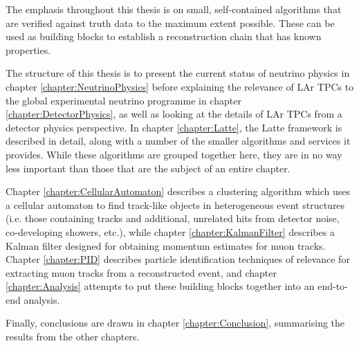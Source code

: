 The emphasis throughout this thesis is on small, self-contained algorithms that are verified against truth data to the maximum extent possible. These can be used as building blocks to establish a reconstruction chain that has known properties.

The structure of this thesis is to present the current status of neutrino physics in chapter \ref{chapter:NeutrinoPhysics} before explaining the relevance of \ac{LAr TPC}s to the global experimental neutrino programme in chapter \ref{chapter:DetectorPhysics}, as well as looking at the details of \ac{LAr TPC}s from a detector physics perspective. In chapter \ref{chapter:Latte}, the Latte framework is described in detail, along with a number of the smaller algorithms and services it provides. While these algorithms are grouped together here, they are in no way less important than those that are the subject of an entire chapter.

Chapter \ref{chapter:CellularAutomaton} describes a clustering algorithm which uses a cellular automaton to find track-like objects in heterogeneous event structures (i.e. those containing tracks and additional, unrelated hits from detector noise, co-developing showers, etc.), while chapter \ref{chapter:KalmanFilter} describes a Kalman filter designed for obtaining momentum estimates for muon tracks. Chapter \ref{chapter:PID} describes particle identification techniques of relevance for extracting muon tracks from a reconstructed event, and chapter \ref{chapter:Analysis} attempts to put these building blocks together into an end-to-end analysis.

Finally, conclusions are drawn in chapter \ref{chapter:Conclusion}, summarising the results from the other chapters.
